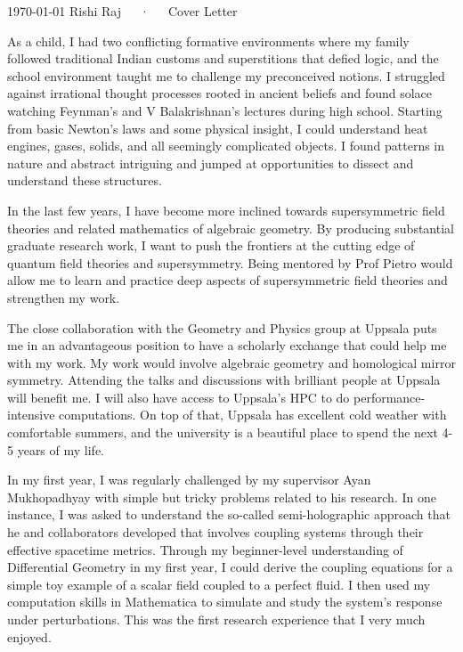 \documentclass[11pt, a4paper]{awesome-cv}
\begin{document}
\makecvheader[R]

\makecvfooter
  {\today}
  {Rishi Raj~~~·~~~Cover Letter}
  {}

\makelettertitle

\begin{cvletter}

  As a child, I had two conflicting formative environments where my family followed traditional Indian customs and superstitions that defied logic, and the school environment taught me to challenge my preconceived notions. I struggled against irrational thought processes rooted in ancient beliefs and found solace watching Feynman's and V Balakrishnan's lectures during high school. Starting from basic Newton's laws and some physical insight, I could understand heat engines, gases, solids, and all seemingly complicated objects. I found patterns in nature and abstract intriguing and jumped at opportunities to dissect and understand these structures. 

  In the last few years, I have become more inclined towards supersymmetric field theories and related mathematics of algebraic geometry. By producing substantial graduate research work, I want to push the frontiers at the cutting edge of quantum field theories and supersymmetry. Being mentored by Prof Pietro would allow me to learn and practice deep aspects of supersymmetric field theories and strengthen my work. 
  
  The close collaboration with the Geometry and Physics group at Uppsala puts me in an advantageous position to have a scholarly exchange that could help me with my work. My work would involve algebraic geometry and homological mirror symmetry. Attending the talks and discussions with brilliant people at Uppsala will benefit me. I will also have access to Uppsala's HPC to do performance-intensive computations. On top of that, Uppsala has excellent cold weather with comfortable summers, and the university is a beautiful place to spend the next 4-5 years of my life. 
  
  In my first year, I was regularly challenged by my supervisor Ayan Mukhopadhyay with simple but tricky problems related to his research. In one instance, I was asked to understand the so-called semi-holographic approach that he and collaborators developed that involves coupling systems through their effective spacetime metrics. Through my beginner-level understanding of Differential Geometry in my first year, I could derive the coupling equations for a simple toy example of a scalar field coupled to a perfect fluid. I then used my computation skills in Mathematica to simulate and study the system's response under perturbations. This was the first research experience that I very much enjoyed.
  

\end{cvletter}
\end{document}
